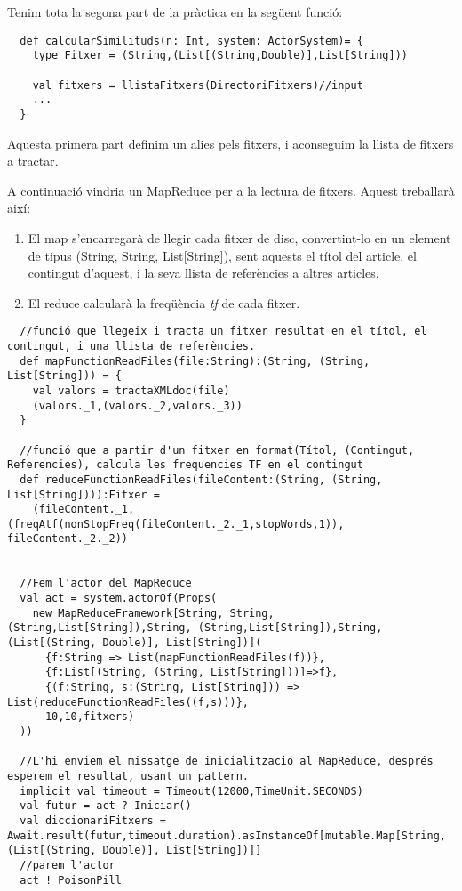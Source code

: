 \documentclass[11pt,a4paper,twoside]{report}
\begin{document}
Tenim tota la segona part de la pràctica en la següent funció:

\begin{lstlisting}
  def calcularSimilituds(n: Int, system: ActorSystem)= {
    type Fitxer = (String,(List[(String,Double)],List[String]))

    val fitxers = llistaFitxers(DirectoriFitxers)//input
    ...
  }
\end{lstlisting}

Aquesta primera part definim un alies pels fitxers, i aconseguim la llista de fitxers a tractar.

A continuació vindria un MapReduce per a la lectura de fitxers. Aquest treballarà així:
\begin{enumerate}
  \item El map s'encarregarà de llegir cada fitxer de disc, convertint-lo en un element de tipus (String, String, List[String]), sent aquests el títol del article, el contingut d'aquest, i la seva llista de referències a altres articles.
  \item El reduce calcularà la freqüència \textit{tf} de cada fitxer.
\end{enumerate}

\begin{lstlisting}
  //funció que llegeix i tracta un fitxer resultat en el títol, el contingut, i una llista de referències.
  def mapFunctionReadFiles(file:String):(String, (String, List[String])) = {
    val valors = tractaXMLdoc(file)
    (valors._1,(valors._2,valors._3))
  }

  //funció que a partir d'un fitxer en format(Títol, (Contingut, Referencies), calcula les frequencies TF en el contingut
  def reduceFunctionReadFiles(fileContent:(String, (String, List[String]))):Fitxer =
    (fileContent._1, (freqAtf(nonStopFreq(fileContent._2._1,stopWords,1)), fileContent._2._2))


  //Fem l'actor del MapReduce
  val act = system.actorOf(Props(
    new MapReduceFramework[String, String, (String,List[String]),String, (String,List[String]),String, (List[(String, Double)], List[String])](
      {f:String => List(mapFunctionReadFiles(f))},
      {f:List[(String, (String, List[String]))]=>f},
      {(f:String, s:(String, List[String])) => List(reduceFunctionReadFiles((f,s)))},
      10,10,fitxers)
  ))

  //L'hi enviem el missatge de inicialització al MapReduce, després esperem el resultat, usant un pattern.
  implicit val timeout = Timeout(12000,TimeUnit.SECONDS)
  val futur = act ? Iniciar()
  val diccionariFitxers = Await.result(futur,timeout.duration).asInstanceOf[mutable.Map[String, (List[(String, Double)], List[String])]]
  //parem l'actor
  act ! PoisonPill
\end{lstlisting}
\end{document}
